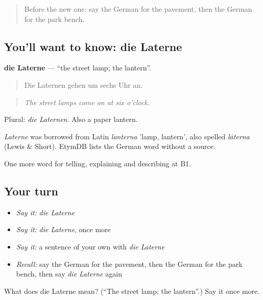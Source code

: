 \label{lesson:GE-C440-laterne}



\begin{quote}
Before the new one: say the German for the pavement, then the German for the park bench.
\end{quote}

\subsection*{You'll want to know: die Laterne}
\textbf{die Laterne} — \textquotedblleft{}the street lamp; the lantern\textquotedblright{}.

\begin{quote}
Die Laternen gehen um sechs Uhr an.
\end{quote}

\begin{quote}
\emph{The street lamps come on at six o'clock.}
\end{quote}

Plural: \emph{die Laternen}. Also a paper lantern.

\begin{cousinweb}
\emph{Laterne} was borrowed from Latin \emph{lanterna} 'lamp, lantern', also spelled \emph{lāterna} (Lewis \& Short). EtymDB lists the German word without a source.
\end{cousinweb}

\begin{grammarlens}[title={What you've built}]
One more word for telling, explaining and describing at B1.
\end{grammarlens}

\subsection*{Your turn}
\begin{itemize}
\raggedright
  \item \emph{Say it:} \emph{die Laterne}
  \item \emph{Say it:} \emph{die Laterne}, once more
  \item \emph{Say it:} a sentence of your own with \emph{die Laterne}
  \item \emph{Recall:} say the German for the pavement, then the German for the park bench, then say \emph{die Laterne} again
\end{itemize}

\begin{tcolorbox}[breakable,colback=teal!4,colframe=teal!35!black,title={Before you move on}]
What does die Laterne mean? (\textquotedblleft{}The street lamp; the lantern\textquotedblright{}.) Say it once more.
\end{tcolorbox}
